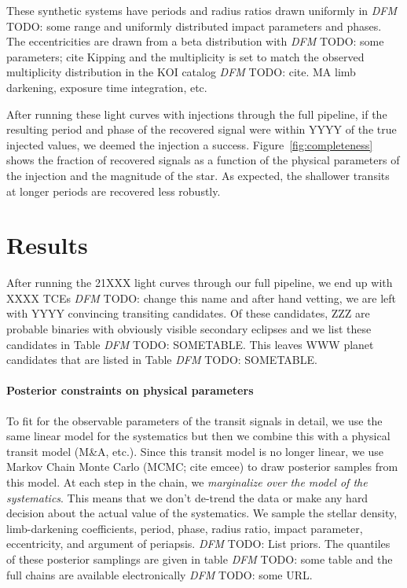 \documentclass[12pt,preprint]{aastex}
\newcommand{\figref}[1]{\ref{fig:#1}}
\newcommand{\Fig}[1]{Figure~\figref{#1}}
\newcommand{\sectlabel}[1]{\label{sect:#1}}
\newcommand{\todo}[3]{{\color{#2} \emph{#1} TODO: #3}}
\newcommand{\dfmtodo}[1]{\todo{DFM}{red}{#1}}
\begin{document}
These synthetic systems have periods and radius ratios drawn uniformly in
\dfmtodo{some range} and uniformly distributed impact parameters and phases.
The eccentricities are drawn from a beta distribution with \dfmtodo{some
parameters; cite Kipping} and the multiplicity is set to match the observed
multiplicity distribution in the KOI catalog \dfmtodo{cite}.
MA limb darkening, exposure time integration, etc.

After running these light curves with injections through the full pipeline, if
the resulting period and phase of the recovered signal were within YYYY of the
true injected values, we deemed the injection a success.
\Fig{completeness} shows the fraction of recovered signals as a function of the
physical parameters of the injection and the magnitude of the star.
As expected, the shallower transits at longer periods are recovered less
robustly.



\section{Results}
\sectlabel{results}

After running the 21XXX light curves through our full pipeline, we end up
with XXXX TCEs \dfmtodo{change this name} and after hand vetting, we are left
with YYYY convincing transiting candidates.
Of these candidates, ZZZ are probable binaries with obviously visible
secondary eclipses and we list these candidates in Table \dfmtodo{SOMETABLE}.
This leaves WWW planet candidates that are listed in Table
\dfmtodo{SOMETABLE}.

\paragraph{Posterior constraints on physical parameters}

To fit for the observable parameters of the transit signals in detail, we use
the same linear model for the systematics but then we combine this with a
physical transit model (M\&A, etc.).
Since this transit model is no longer linear, we use Markov Chain Monte Carlo
(MCMC; cite emcee) to draw posterior samples from this model.
At each step in the chain, we \emph{marginalize over the model of the
systematics}.
This means that we don't de-trend the data or make any hard decision about
the actual value of the systematics.
We sample the stellar density, limb-darkening coefficients, period, phase,
radius ratio, impact parameter, eccentricity, and argument of periapsis.
\dfmtodo{List priors.}
The quantiles of these posterior samplings are given in table \dfmtodo{some
table} and the full chains are available electronically \dfmtodo{some URL}.
\end{document}
